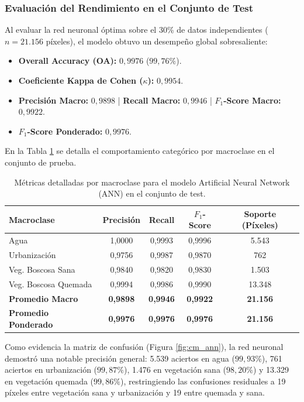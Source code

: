 \documentclass[12pt]{article}
\begin{document}
\subsubsection{Evaluación del Rendimiento en el Conjunto de Test}
Al evaluar la red neuronal óptima sobre el 30\% de datos independientes ($n = 21.156$ píxeles), el modelo obtuvo un desempeño global sobresaliente:
\begin{itemize}
    \item \textbf{Overall Accuracy (OA):} $0{,}9976$ ($99{,}76\%$).
    \item \textbf{Coeficiente Kappa de Cohen ($\kappa$):} $0{,}9954$.
    \item \textbf{Precisión Macro:} $0{,}9898$ | \textbf{Recall Macro:} $0{,}9946$ | \textbf{$F_1$-Score Macro:} $0{,}9922$.
    \item \textbf{$F_1$-Score Ponderado:} $0{,}9976$.
\end{itemize}

En la Tabla \ref{tab:reporte_ann} se detalla el comportamiento categórico por macroclase en el conjunto de prueba.

\begin{table}[H]
    \centering
    \caption{Métricas detalladas por macroclase para el modelo Artificial Neural Network (ANN) en el conjunto de test.}
    \label{tab:reporte_ann}
    \begin{tabular}{@{}lcccc@{}}
        \toprule
        \textbf{Macroclase} & \textbf{Precisión} & \textbf{Recall} & \textbf{$F_1$-Score} & \textbf{Soporte (Píxeles)} \\
        \midrule
        Agua & 1,0000 & 0,9993 & 0,9996 & 5.543 \\
        Urbanización & 0,9756 & 0,9987 & 0,9870 & 762 \\
        Veg. Boscosa Sana & 0,9840 & 0,9820 & 0,9830 & 1.503 \\
        Veg. Boscosa Quemada & 0,9994 & 0,9986 & 0,9990 & 13.348 \\
        \midrule
        \textbf{Promedio Macro} & \textbf{0,9898} & \textbf{0,9946} & \textbf{0,9922} & \textbf{21.156} \\
        \textbf{Promedio Ponderado} & \textbf{0,9976} & \textbf{0,9976} & \textbf{0,9976} & \textbf{21.156} \\
        \bottomrule
    \end{tabular}
\end{table}

Como evidencia la matriz de confusión (Figura \ref{fig:cm_ann}), la red neuronal demostró una notable precisión general: 5.539 aciertos en agua ($99{,}93\%$), 761 aciertos en urbanización ($99{,}87\%$), 1.476 en vegetación sana ($98{,}20\%$) y 13.329 en vegetación quemada ($99{,}86\%$), restringiendo las confusiones residuales a 19 píxeles entre vegetación sana y urbanización y 19 entre quemada y sana.
\end{document}

